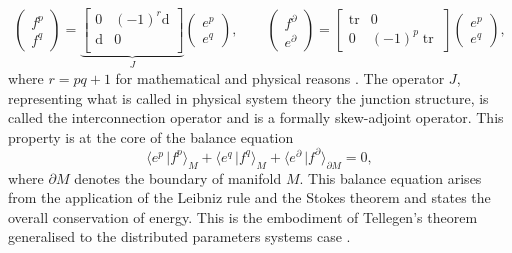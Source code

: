\documentclass{elsarticle}
\renewcommand\d{\ensuremath{\mathrm{d}}}
\DeclareMathOperator{\tr}{tr}
\newcommand{\dualpr}[3][]{\ensuremath{\langle #2 \, \vert #3 \rangle_{#1}}}
\begin{document}
\begin{equation}\label{eq:StokesDirac}
    \begin{pmatrix}
        {f}^p \\
        {f}^q
    \end{pmatrix} = 
    \underbrace{\begin{bmatrix}
    0 & (-1)^r \d \\
    \d & 0 \\
    \end{bmatrix}}_{J}
    \begin{pmatrix}
        {e}^p \\
        {e}^q
    \end{pmatrix}, \qquad 
    \begin{pmatrix}
        {f}^\partial \\
        {e}^\partial
    \end{pmatrix} = 
    \begin{bmatrix}
    \tr & 0 \\
    0 &  (-1)^p\tr
    \end{bmatrix}
    \begin{pmatrix}
        {e}^p \\
        {e}^q
    \end{pmatrix},
\end{equation}
where $r = pq +1$ for mathematical and physical reasons \cite{vanderSchaft2002}. The operator $J$, representing what is called in physical system theory the junction structure, is called the interconnection operator and is a formally skew-adjoint operator.  This property is at the core of the balance equation
\begin{equation}\label{eq:bal_eq}
    \dualpr[M]{e^p}{f^p} + \dualpr[M]{e^q}{f^q} + \dualpr[\partial M]{e^\partial}{f^\partial} = 0,
\end{equation}
where $\partial M$ denotes the boundary of manifold $M$. 
This balance equation arises from the application of the Leibniz rule and the Stokes theorem and states the overall conservation of energy.
This is the  embodiment of Tellegen's theorem generalised to the  distributed parameters systems case \cite{iftime2014kernel}.
\end{document}
